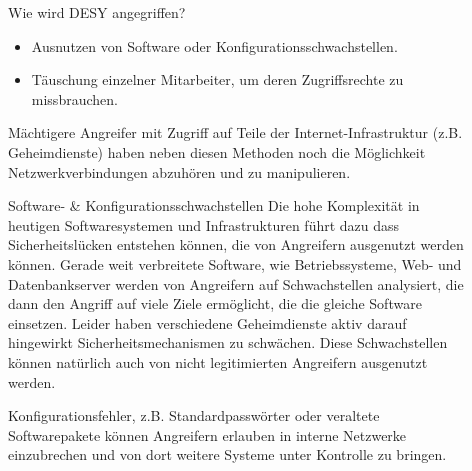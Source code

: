 \documentclass[final]{beamer}
\newlength{\sepwid}
\newlength{\twocolwid}
\begin{document}
\begin{frame}[t]
\begin{columns}[t, totalwidth=\textwidth]
\begin{column}{\twocolwid}
\begin{block}{Wie wird DESY angegriffen?}
\begin{itemize}
 \item Ausnutzen von Software oder Konfigurationsschwachstellen.
 \item Täuschung einzelner Mitarbeiter, um deren Zugriffsrechte zu missbrauchen.
\end{itemize}

Mächtigere Angreifer mit Zugriff auf Teile der Internet-Infrastruktur 
(z.B. Geheimdienste) haben neben diesen Methoden noch die Möglichkeit 
Netzwerkverbindungen abzuhören und zu manipulieren.

\end{block}

\begin{block}{Software- \& Konfigurationsschwachstellen}
 Die hohe Komplexität in heutigen Softwaresystemen und Infrastrukturen führt dazu dass
 Sicherheitslücken entstehen können, die von Angreifern ausgenutzt werden können. 
 Gerade weit verbreitete Software, wie Betriebssysteme, Web- und Datenbankserver werden 
 von Angreifern auf Schwachstellen analysiert, die dann den Angriff auf viele Ziele ermöglicht, 
 die die gleiche Software einsetzen. Leider haben verschiedene Geheimdienste aktiv darauf 
 hingewirkt Sicherheitsmechanismen zu schwächen. Diese Schwachstellen können natürlich auch 
 von nicht legitimierten Angreifern ausgenutzt werden.
 \par
 Konfigurationsfehler, z.B. Standardpasswörter oder veraltete Softwarepakete können
 Angreifern erlauben in interne Netzwerke einzubrechen und von dort weitere Systeme 
 unter Kontrolle zu bringen.
\end{block}


\end{column} %

\begin{column}{\sepwid}\end{column} %

\begin{column}{\twocolwid} %


\end{column}
\end{columns}
\end{frame}
\end{document}

